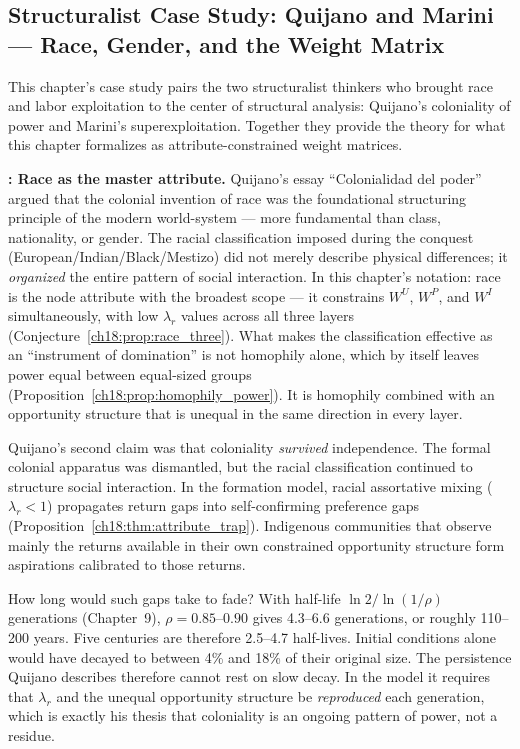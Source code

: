 \documentclass[../structural_economics_book.tex]{subfiles}
\begin{document}
\subsection*{Structuralist Case Study: Quijano and Marini --- Race, Gender, and the Weight Matrix}

This chapter's case study pairs the two structuralist thinkers who brought race and labor exploitation to the center of structural analysis: Quijano's coloniality of power and Marini's superexploitation. Together they provide the theory for what this chapter formalizes as attribute-constrained weight matrices.

\textbf{\citet{quijano2000colonialidad}: Race as the master attribute.} Quijano's essay ``Colonialidad del poder'' argued that the colonial invention of race was the foundational structuring principle of the modern world-system --- more fundamental than class, nationality, or gender. The racial classification imposed during the conquest (European/Indian/Black/Mestizo) did not merely describe physical differences; it \textit{organized} the entire pattern of social interaction. In this chapter's notation: race is the node attribute with the broadest scope --- it constrains $W^U$, $W^P$, and $W^I$ simultaneously, with low $\lambda_r$ values across all three layers (Conjecture~\ref{ch18:prop:race_three}). What makes the classification effective as an ``instrument of domination'' is not homophily alone, which by itself leaves power equal between equal-sized groups (Proposition~\ref{ch18:prop:homophily_power}). It is homophily combined with an opportunity structure that is unequal in the same direction in every layer.

Quijano's second claim was that coloniality \textit{survived} independence. The formal colonial apparatus was dismantled, but the racial classification continued to structure social interaction. In the formation model, racial assortative mixing ($\lambda_r < 1$) propagates return gaps into self-confirming preference gaps (Proposition~\ref{ch18:thm:attribute_trap}). Indigenous communities that observe mainly the returns available in their own constrained opportunity structure form aspirations calibrated to those returns.

How long would such gaps take to fade? With half-life $\ln 2/\ln(1/\rho)$ generations (Chapter~9), $\rho = 0.85$--$0.90$ gives 4.3--6.6 generations, or roughly 110--200 years. Five centuries are therefore 2.5--4.7 half-lives. Initial conditions alone would have decayed to between 4\% and 18\% of their original size. The persistence Quijano describes therefore cannot rest on slow decay. In the model it requires that $\lambda_r$ and the unequal opportunity structure be \emph{reproduced} each generation, which is exactly his thesis that coloniality is an ongoing pattern of power, not a residue.
\end{document}
